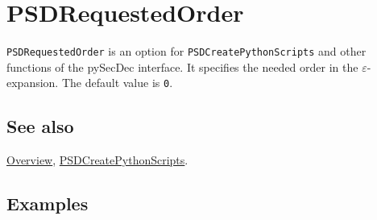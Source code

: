 \documentclass[../FeynHelpersManual.tex]{subfiles}
\begin{document}
\hypertarget{psdrequestedorder}{
\section{PSDRequestedOrder}\label{psdrequestedorder}}

\texttt{PSDRequestedOrder} is an option for
\texttt{PSDCreatePythonScripts} and other functions of the pySecDec
interface. It specifies the needed order in the
\(\varepsilon\)-expansion. The default value is \texttt{0}.

\subsection{See also}

\hyperlink{toc}{Overview},
\hyperlink{psdcreatepythonscripts}{PSDCreatePythonScripts}.

\subsection{Examples}
\end{document}
